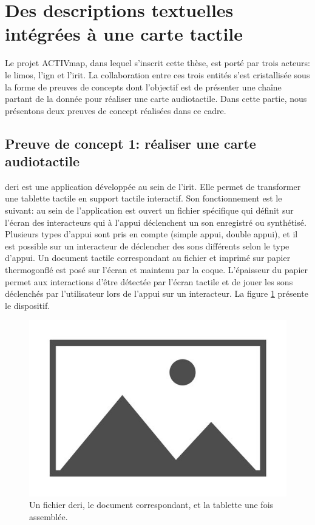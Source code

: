 \section{Des descriptions textuelles intégrées à une carte tactile}

Le projet ACTIVmap, dans lequel s'inscrit cette thèse, est porté par trois acteurs: le \gls{limos}, l'\gls{ign} et l'\gls{irit}. La collaboration entre ces trois entités s'est cristallisée sous la forme de preuves de concepts dont l'objectif est de présenter une chaîne partant de la donnée pour réaliser une carte audiotactile. Dans cette partie, nous présentons deux preuves de concept réalisées dans ce cadre.

\subsection{Preuve de concept 1: réaliser une carte audiotactile}

\label{sec:experimentation_poc1}

\gls{deri} \missref{} est une application développée au sein de l'\gls{irit}. Elle permet de transformer une tablette tactile en support tactile interactif. Son fonctionnement est le suivant: au sein de l'application est ouvert un fichier spécifique qui définit sur l'écran des interacteurs qui à l'appui déclenchent un son enregistré ou synthétisé. Plusieurs types d'appui sont pris en compte (simple appui, double appui), et il est possible sur un interacteur de déclencher des sons différents selon le type d'appui. Un document tactile correspondant au fichier et imprimé sur papier thermogonflé est posé sur l'écran et maintenu par la coque. L'épaisseur du papier permet aux interactions d'être détectée par l'écran tactile et de jouer les sons déclenchés par l'utilisateur lors de l'appui sur un interacteur. La figure \ref{fig:experimentation_exemple_deri} présente le dispositif.

\begin{figure}
    \centering
    \includegraphics{images/placeholder.jpg}
    \caption{Un fichier \gls{deri}, le document correspondant, et la tablette une fois assemblée.}
    \label{fig:experimentation_exemple_deri}
\end{figure}

